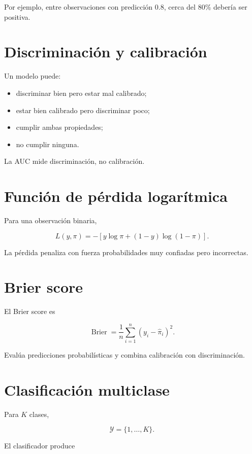 \documentclass[
  spanish,
  11pt,
  letterpaper,
  DIV=11,
  numbers=noendperiod]{scrreprt}
\providecommand{\tightlist}{%
  \setlength{\itemsep}{0pt}\setlength{\parskip}{0pt}}
\theoremstyle{definition}
\theoremstyle{plain}
\theoremstyle{definition}
\theoremstyle{remark}
\begin{document}
Por ejemplo, entre observaciones con predicción \(0.8\), cerca del
\(80\%\) debería ser positiva.

\section{Discriminación y
calibración}\label{discriminaciuxf3n-y-calibraciuxf3n}

Un modelo puede:

\begin{itemize}
\tightlist
\item
  discriminar bien pero estar mal calibrado;
\item
  estar bien calibrado pero discriminar poco;
\item
  cumplir ambas propiedades;
\item
  no cumplir ninguna.
\end{itemize}

La AUC mide discriminación, no calibración.

\section{Función de pérdida
logarítmica}\label{funciuxf3n-de-puxe9rdida-logaruxedtmica}

Para una observación binaria,

\[
L(y,\pi)
=
-
\left[
y\log\pi
+
(1-y)\log(1-\pi)
\right].
\]

La pérdida penaliza con fuerza probabilidades muy confiadas pero
incorrectas.

\section{Brier score}\label{brier-score}

El Brier score es

\[
\operatorname{Brier}
=
\frac{1}{n}
\sum_{i=1}^{n}
(
y_i-\widehat{\pi}_i
)^2.
\]

Evalúa predicciones probabilísticas y combina calibración con
discriminación.

\section{Clasificación multiclase}\label{clasificaciuxf3n-multiclase-1}

Para \(K\) clases,

\[
\mathcal{Y}
=
\{1,\ldots,K\}.
\]

El clasificador produce
\end{document}
